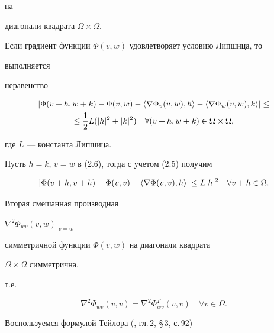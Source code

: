 на


диагонали квадрата $\Omega\times\Omega$.





Если градиент функции $\Phi(v,w)$ удовлетворяет условию Липшица, то


выполняется


неравенство


\begin{multline}


|\Phi(v+h,w+k)-\Phi(v,w)-\la\nabla\Phi_v(v,w),h\ra-


\la\nabla\Phi_w(v,w),k\ra|\le \\


\le \frac{1}{2}L(|h|^2+|k|^2)\quad \forall


(v+h,w+k)\in\Omega\times\Omega,


\end{multline}


где $L$ --- константа Липшица.


Пусть $h=k$, $v=w$ в (2.6), тогда с учетом (2.5) получим


\begin{equation}


|\Phi(v+h,v+h)-\Phi(v,v)-\la\nabla\Phi(v,v),h\ra|\le


L|h|^2\quad \forall v+h\in\Omega.


\end{equation}





\begin{pty} Вторая смешанная производная


$\nabla^2\Phi_{wv}(v,w)|_{v=w}$


симметричной функции $\Phi(v,w)$ на диагонали квадрата


$\Omega\times\Omega$ симметрична,


т.е.


\begin{equation}


\nabla^2\Phi_{wv}(v,v)=\nabla^2\Phi^T_{wv}(v,v)\quad


\forall v\in \Omega.


\end{equation}


\end{pty}





Воспользуемся формулой Тейлора (\cite{Vas}, гл.\,2, \S\,3, с.\,92)


